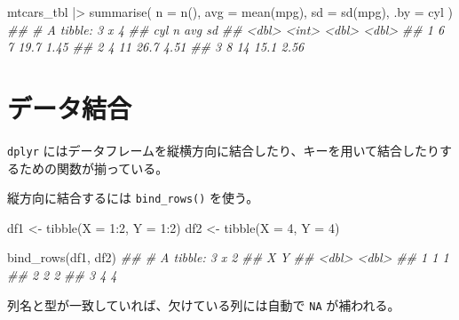 \documentclass[
  letterpaper,
  xelatex,
  ja=standard, xelatex]{bxjsbook}
\newenvironment{Shaded}{\begin{snugshade}}{\end{snugshade}}
\newcommand{\AttributeTok}[1]{\textcolor[rgb]{0.40,0.45,0.13}{#1}}
\newcommand{\DecValTok}[1]{\textcolor[rgb]{0.68,0.00,0.00}{#1}}
\newcommand{\DocumentationTok}[1]{\textcolor[rgb]{0.37,0.37,0.37}{\textit{#1}}}
\newcommand{\FunctionTok}[1]{\textcolor[rgb]{0.28,0.35,0.67}{#1}}
\newcommand{\NormalTok}[1]{\textcolor[rgb]{0.00,0.23,0.31}{#1}}
\newcommand{\OtherTok}[1]{\textcolor[rgb]{0.00,0.23,0.31}{#1}}
\newcommand{\SpecialCharTok}[1]{\textcolor[rgb]{0.37,0.37,0.37}{#1}}
\begin{document}
\begin{Shaded}
\begin{Highlighting}[]
\NormalTok{mtcars\_tbl }\SpecialCharTok{|\textgreater{}} 
  \FunctionTok{summarise}\NormalTok{(}
    \AttributeTok{n   =} \FunctionTok{n}\NormalTok{(),}
    \AttributeTok{avg =} \FunctionTok{mean}\NormalTok{(mpg),}
    \AttributeTok{sd  =} \FunctionTok{sd}\NormalTok{(mpg),}
    \AttributeTok{.by =}\NormalTok{ cyl}
\NormalTok{  )}
\DocumentationTok{\#\# \# A tibble: 3 x 4}
\DocumentationTok{\#\#     cyl     n   avg    sd}
\DocumentationTok{\#\#   \textless{}dbl\textgreater{} \textless{}int\textgreater{} \textless{}dbl\textgreater{} \textless{}dbl\textgreater{}}
\DocumentationTok{\#\# 1     6     7  19.7  1.45}
\DocumentationTok{\#\# 2     4    11  26.7  4.51}
\DocumentationTok{\#\# 3     8    14  15.1  2.56}
\end{Highlighting}
\end{Shaded}

\section{データ結合}\label{ux30c7ux30fcux30bfux7d50ux5408}

\texttt{dplyr}
にはデータフレームを縦横方向に結合したり、キーを用いて結合したりするための関数が揃っている。

縦方向に結合するには \texttt{bind\_rows()} を使う。

\begin{Shaded}
\begin{Highlighting}[]
\NormalTok{df1 }\OtherTok{\textless{}{-}} \FunctionTok{tibble}\NormalTok{(}\AttributeTok{X =} \DecValTok{1}\SpecialCharTok{:}\DecValTok{2}\NormalTok{, }\AttributeTok{Y =} \DecValTok{1}\SpecialCharTok{:}\DecValTok{2}\NormalTok{)}
\NormalTok{df2 }\OtherTok{\textless{}{-}} \FunctionTok{tibble}\NormalTok{(}\AttributeTok{X =} \DecValTok{4}\NormalTok{,   }\AttributeTok{Y =} \DecValTok{4}\NormalTok{)}

\FunctionTok{bind\_rows}\NormalTok{(df1, df2)}
\DocumentationTok{\#\# \# A tibble: 3 x 2}
\DocumentationTok{\#\#       X     Y}
\DocumentationTok{\#\#   \textless{}dbl\textgreater{} \textless{}dbl\textgreater{}}
\DocumentationTok{\#\# 1     1     1}
\DocumentationTok{\#\# 2     2     2}
\DocumentationTok{\#\# 3     4     4}
\end{Highlighting}
\end{Shaded}

列名と型が一致していれば、欠けている列には自動で \texttt{NA}
が補われる。
\end{document}

